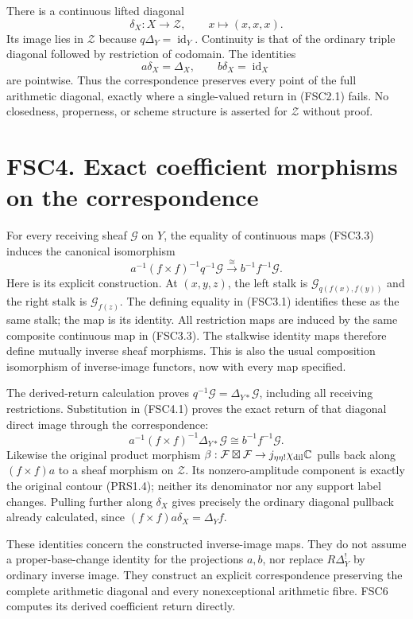 There is a continuous lifted diagonal \[
\delta_X:X\to\mathcal Z,\qquad x\mapsto(x,x,x).
\tag{FSC3.5}
\] Its image lies in \(\mathcal Z\) because
\(q\Delta_Y=\operatorname{id}_Y\). Continuity is that of the ordinary
triple diagonal followed by restriction of codomain. The identities \[
a\delta_X=\Delta_X,\qquad b\delta_X=\operatorname{id}_X
\tag{FSC3.6}
\] are pointwise. Thus the correspondence preserves every point of the
full arithmetic diagonal, exactly where a single-valued return in
(FSC2.1) fails. No closedness, properness, or scheme structure is
asserted for \(\mathcal Z\) without proof.

\section{FSC4. Exact coefficient morphisms on the
correspondence}\label{fsc4.-exact-coefficient-morphisms-on-the-correspondence}

For every receiving sheaf \(\mathcal G\) on \(Y\), the equality of
continuous maps (FSC3.3) induces the canonical isomorphism \[
a^{-1}(f\times f)^{-1}q^{-1}\mathcal G
\xrightarrow{\ \cong\ }b^{-1}f^{-1}\mathcal G.
\tag{FSC4.1}
\] Here is its explicit construction. At \((x,y,z)\), the left stalk is
\(\mathcal G_{q(f(x),f(y))}\) and the right stalk is
\(\mathcal G_{f(z)}\). The defining equality in (FSC3.1) identifies
these as the same stalk; the map is its identity. All restriction maps
are induced by the same composite continuous map in (FSC3.3). The
stalkwise identity maps therefore define mutually inverse sheaf
morphisms. This is also the usual composition isomorphism of
inverse-image functors, now with every map specified.

The derived-return calculation proves
\(q^{-1}\mathcal G=\Delta_{Y*}\mathcal G\), including all receiving
restrictions. Substitution in (FSC4.1) proves the exact return of that
diagonal direct image through the correspondence: \[
a^{-1}(f\times f)^{-1}\Delta_{Y*}\mathcal G
\cong b^{-1}f^{-1}\mathcal G.
\tag{FSC4.2}
\] Likewise the original product morphism
\(\beta:\mathcal F\boxtimes\mathcal F\to j_{\eta\eta!}\chi_{\rm dil}\mathbb C\)
pulls back along \((f\times f)a\) to a sheaf morphism on \(\mathcal Z\).
Its nonzero-amplitude component is exactly the original contour
(PRS1.4); neither its denominator nor any support label changes. Pulling
further along \(\delta_X\) gives precisely the ordinary diagonal
pullback already calculated, since \((f\times f)a\delta_X=\Delta_Yf\).

These identities concern the constructed inverse-image maps. They do not
assume a proper-base-change identity for the projections \(a,b\), nor
replace \(R\Delta_Y^!\) by ordinary inverse image. They construct an
explicit correspondence preserving the complete arithmetic diagonal and
every nonexceptional arithmetic fibre. FSC6 computes its derived
coefficient return directly.

